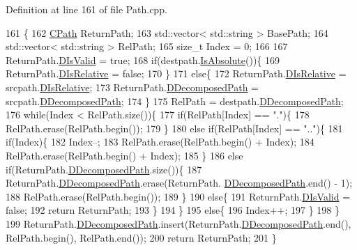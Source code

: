 Definition at line 161 of file Path.\+cpp.


\begin{DoxyCode}
161                                                                     \{
162     \hyperlink{classCPath}{CPath} ReturnPath;
163     std::vector< std::string > BasePath;
164     std::vector< std::string > RelPath;
165     \textcolor{keywordtype}{size\_t} Index = 0;
166 
167     ReturnPath.\hyperlink{classCPath_a992aca27a1cba1c3bae3d04438821192}{DIsValid} = \textcolor{keyword}{true};
168     \textcolor{keywordflow}{if}(destpath.\hyperlink{classCPath_a613d8d4c4b72dba9fc8b6e487f583d7d}{IsAbsolute}())\{
169        ReturnPath.\hyperlink{classCPath_af705ff149bb2281c67afb84fff550eb9}{DIsRelative} = \textcolor{keyword}{false};
170     \}
171     \textcolor{keywordflow}{else}\{
172         ReturnPath.\hyperlink{classCPath_af705ff149bb2281c67afb84fff550eb9}{DIsRelative} = srcpath.\hyperlink{classCPath_af705ff149bb2281c67afb84fff550eb9}{DIsRelative};
173         ReturnPath.\hyperlink{classCPath_a03ed25209a01e633c107a0c877fc61f8}{DDecomposedPath} = srcpath.\hyperlink{classCPath_a03ed25209a01e633c107a0c877fc61f8}{DDecomposedPath};
174     \}
175     RelPath = destpath.\hyperlink{classCPath_a03ed25209a01e633c107a0c877fc61f8}{DDecomposedPath};
176     \textcolor{keywordflow}{while}(Index  < RelPath.size())\{
177         \textcolor{keywordflow}{if}(RelPath[Index] == \textcolor{stringliteral}{"."})\{
178             RelPath.erase(RelPath.begin());
179         \}
180         \textcolor{keywordflow}{else} \textcolor{keywordflow}{if}(RelPath[Index] == \textcolor{stringliteral}{".."})\{
181             \textcolor{keywordflow}{if}(Index)\{
182                 Index--;
183                 RelPath.erase(RelPath.begin() + Index);
184                 RelPath.erase(RelPath.begin() + Index);
185             \}
186             \textcolor{keywordflow}{else} \textcolor{keywordflow}{if}(ReturnPath.\hyperlink{classCPath_a03ed25209a01e633c107a0c877fc61f8}{DDecomposedPath}.size())\{
187                 ReturnPath.\hyperlink{classCPath_a03ed25209a01e633c107a0c877fc61f8}{DDecomposedPath}.erase(ReturnPath.
      \hyperlink{classCPath_a03ed25209a01e633c107a0c877fc61f8}{DDecomposedPath}.end() - 1);
188                 RelPath.erase(RelPath.begin());
189             \}
190             \textcolor{keywordflow}{else}\{
191                 ReturnPath.\hyperlink{classCPath_a992aca27a1cba1c3bae3d04438821192}{DIsValid} = \textcolor{keyword}{false};
192                 \textcolor{keywordflow}{return} ReturnPath;
193             \}
194         \}
195         \textcolor{keywordflow}{else}\{
196             Index++;
197         \}
198     \}    
199     ReturnPath.\hyperlink{classCPath_a03ed25209a01e633c107a0c877fc61f8}{DDecomposedPath}.insert(ReturnPath.\hyperlink{classCPath_a03ed25209a01e633c107a0c877fc61f8}{DDecomposedPath}.end(), 
      RelPath.begin(), RelPath.end());
200     \textcolor{keywordflow}{return} ReturnPath;
201 \}
\end{DoxyCode}
